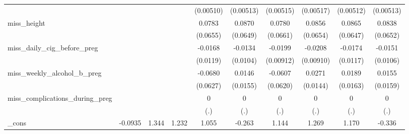 \begin{table}[htbp]
\begin{tabular}{l*{9}{c}}
            &                     &                     &                     &   (0.00510)         &   (0.00513)         &   (0.00515)         &   (0.00517)         &   (0.00512)         &   (0.00513)         \\
[1em]
miss\_height &                     &                     &                     &      0.0783         &      0.0870         &      0.0780         &      0.0856         &      0.0865         &      0.0838         \\
            &                     &                     &                     &    (0.0655)         &    (0.0649)         &    (0.0661)         &    (0.0654)         &    (0.0647)         &    (0.0652)         \\
[1em]
miss\_daily\_cig\_before\_preg&                     &                     &                     &     -0.0168         &     -0.0134         &     -0.0199\sym{**} &     -0.0208\sym{**} &     -0.0174         &     -0.0151         \\
            &                     &                     &                     &    (0.0119)         &    (0.0104)         &   (0.00912)         &   (0.00910)         &    (0.0117)         &    (0.0106)         \\
[1em]
miss\_weekly\_alcohol\_b\_preg&                     &                     &                     &     -0.0680         &      0.0146         &     -0.0607         &      0.0271\sym{*}  &      0.0189         &      0.0155         \\
            &                     &                     &                     &    (0.0627)         &    (0.0155)         &    (0.0620)         &    (0.0144)         &    (0.0163)         &    (0.0159)         \\
[1em]
miss\_complications\_during\_preg&                     &                     &                     &           0         &           0         &           0         &           0         &           0         &           0         \\
            &                     &                     &                     &         (.)         &         (.)         &         (.)         &         (.)         &         (.)         &         (.)         \\
[1em]
\_cons      &     -0.0935         &       1.344         &       1.232         &       1.055         &      -0.263         &       1.144         &       1.269         &       1.170         &      -0.336         \\

\end{tabular}
\end{table}

